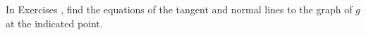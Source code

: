 {\noindent In Exercises}
{, find the equations of the tangent and normal lines to the graph of $g$ at the indicated point.
}

